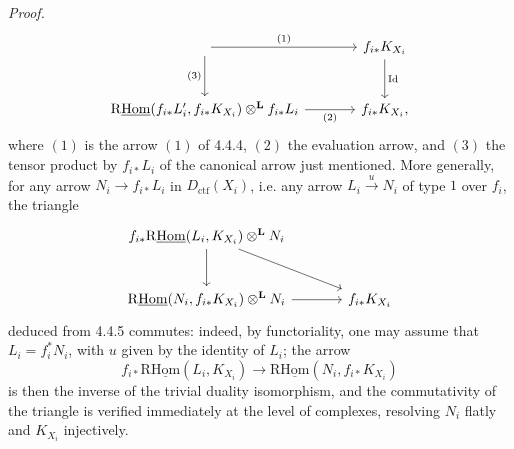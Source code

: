 \documentclass[11pt]{article}
\newenvironment{prooftext}[1][Proof]{\par\noindent\emph{#1.}\ }{\par\medskip}
\providecommand{\Dctf}{D_{\mathrm{ctf}}}
\providecommand{\Id}{\mathrm{Id}}
\providecommand{\Dctf}{D_{\mathrm{ctf}}}
\begin{document}
\begin{prooftext}[Proof]
\begin{equation}
\begin{tikzcd}[column sep=large,row sep=large]
 \arrow[r,"(1)"] \arrow[d,"(3)"'] &
f_{i*}K_{X_i} \arrow[d,"\Id"]\\
\mathrm{R}\underline{\mathrm{Hom}}(f_{i*}L'_i,f_{i*}K_{X_i})\otimes^{\mathbf L} f_{i*}L_i
 \arrow[r,"(2)"'] &
f_{i*}K_{X_i},
\end{tikzcd}
\end{equation}
where $(1)$ is the arrow $(1)$ of 4.4.4, $(2)$ the evaluation arrow, and $(3)$ the tensor product by $f_{i*}L_i$ of the canonical arrow just mentioned. More generally, for any arrow $N_i\longrightarrow f_{i*}L_i$ in $\Dctf(X_i)$, i.e. any arrow $L_i\xrightarrow{u}N_i$ of type $1$ over $f_i$, the triangle
\[
\begin{tikzcd}[column sep=large,row sep=large]
f_{i*}\mathrm{R}\underline{\mathrm{Hom}}(L_i,K_{X_i})\otimes^{\mathbf L}N_i
 \arrow[dr] \arrow[d] & \\
\mathrm{R}\underline{\mathrm{Hom}}(N_i,f_{i*}K_{X_i})\otimes^{\mathbf L}N_i \arrow[r] &
f_{i*}K_{X_i}
\end{tikzcd}
\]
deduced from 4.4.5 commutes: indeed, by functoriality, one may assume that $L_i=f_i^*N_i$, with $u$ given by the identity of $L_i$; the arrow
\[
f_{i*}\mathrm{R}\underline{\mathrm{Hom}}(L_i,K_{X_i})\longrightarrow\mathrm{R}\underline{\mathrm{Hom}}(N_i,f_{i*}K_{X_i})
\]
is then the inverse of the trivial duality isomorphism, and the commutativity of the triangle is verified immediately at the level of complexes, resolving $N_i$ flatly and $K_{X_i}$ injectively.


\end{prooftext}
\end{document}
